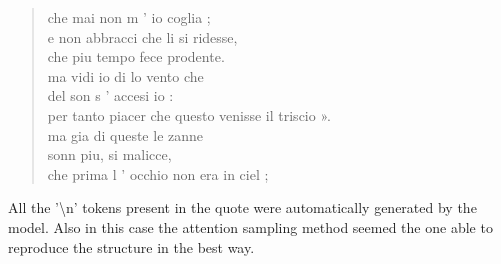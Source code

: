 \documentclass[10pt,twocolumn,letterpaper]{article}
\begin{document}
\begin{quote}
 che mai non m ’ io coglia ;\\
 e non abbracci che li si ridesse,\\
 che piu tempo fece prodente.\\


 ma vidi io di lo vento che\\
 del son s ’ accesi io :\\
 per tanto piacer che questo venisse il triscio ».\\


 ma gia di queste le zanne\\
 sonn piu, si malicce,\\
 che prima l ’ occhio non era in ciel ;\\

\end{quote}

%
%
%
%

All the '\textbackslash n' tokens present in the quote were automatically generated by the model.
Also in this case the attention sampling method seemed the one able to reproduce the structure in the best way.
\end{document}
